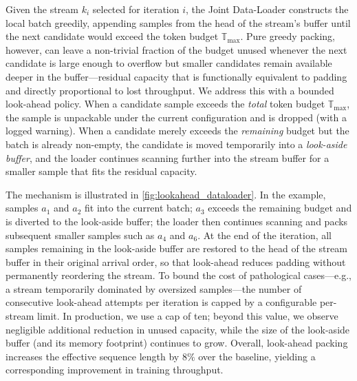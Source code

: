 Given the stream $k_i$ selected for iteration $i$, the Joint Data-Loader constructs the local batch greedily, appending samples from the head of the stream's buffer until the next candidate would exceed the token budget $\mathbb{T}_{\max}$. Pure greedy packing, however, can leave a non-trivial fraction of the budget unused whenever the next candidate is large enough to overflow but smaller candidates remain available deeper in the buffer---residual capacity that is functionally equivalent to padding and directly proportional to lost throughput. We address this with a bounded look-ahead policy. When a candidate sample exceeds the \emph{total} token budget $\mathbb{T}_{\max}$, the sample is unpackable under the current configuration and is dropped (with a logged warning). When a candidate merely exceeds the \emph{remaining} budget but the batch is already non-empty, the candidate is moved temporarily into a \emph{look-aside buffer}, and the loader continues scanning further into the stream buffer for a smaller sample that fits the residual capacity.

The mechanism is illustrated in \cref{fig:lookahead_dataloader}. In the example, samples $a_1$ and $a_2$ fit into the current batch; $a_3$ exceeds the remaining budget and is diverted to the look-aside buffer; the loader then continues scanning and packs subsequent smaller samples such as $a_4$ and $a_6$. At the end of the iteration, all samples remaining in the look-aside buffer are restored to the head of the stream buffer in their original arrival order, so that look-ahead reduces padding without permanently reordering the stream. To bound the cost of pathological cases---e.g., a stream temporarily dominated by oversized samples---the number of consecutive look-ahead attempts per iteration is capped by a configurable per-stream limit. In production, we use a cap of ten; beyond this value, we observe negligible additional reduction in unused capacity, while the size of the look-aside buffer (and its memory footprint) continues to grow. Overall, look-ahead packing increases the effective sequence length by $8\%$ over the baseline, yielding a corresponding improvement in training throughput.



